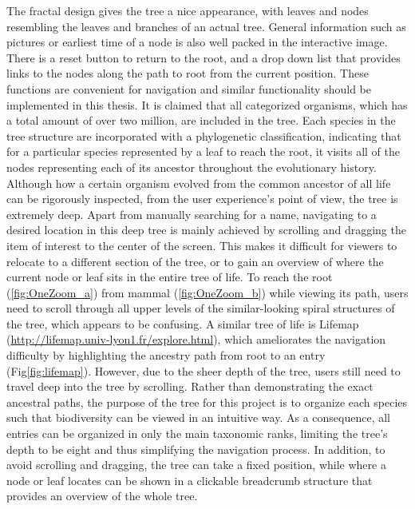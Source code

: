 \documentclass[11pt, a4paper,oneside,chapterprefix=false]{scrbook}
\begin{document}
The fractal design gives the tree a nice appearance, with leaves and nodes resembling the leaves and branches of an actual tree. General information such as pictures or earliest time of a node is also well packed in the interactive image. There is a reset button to return to the root, and a drop down list that provides links to the nodes along the path to root from the current position. These functions are convenient for navigation and similar functionality should be implemented in this thesis. It is claimed that all categorized organisms, which has a total amount of over two million, are included in the tree. Each species in the tree structure are incorporated with a phylogenetic classification, indicating that for a particular species represented by a leaf to reach the root, it visits all of the nodes representing each of its ancestor throughout the evolutionary history. Although how a certain organism evolved from the common ancestor of all life can be rigorously inspected, from the user experience's point of view, the tree is extremely deep. Apart from manually searching for a name, navigating to a desired location in this deep tree is mainly achieved by scrolling and dragging the item of interest to the center of the screen. This makes it difficult for viewers to relocate to a different section of the tree, or to gain an overview of where the current node or leaf sits in the entire tree of life. To reach the root (\ref{fig:OneZoom_a}) from mammal (\ref{fig:OneZoom_b}) while viewing its path, users need to scroll through all upper levels of the similar-looking spiral structures of the tree, which appears to be confusing. A similar tree of life is Lifemap (\url{http://lifemap.univ-lyon1.fr/explore.html}), which ameliorates the navigation difficulty by highlighting the ancestry path from root to an entry (Fig\ref{fig:lifemap}). However, due to the sheer depth of the tree, users still need to travel deep into the tree by scrolling. Rather than demonstrating the exact ancestral paths, the purpose of the tree for this project is to organize each species such that biodiversity can be viewed in an intuitive way. As a consequence, all entries can be organized in only the main taxonomic ranks, limiting the tree's depth to be eight and thus simplifying the navigation process. In addition, to avoid scrolling and dragging, the tree can take a fixed position, while where a node or leaf locates can be shown in a clickable breadcrumb structure that provides an overview of the whole tree. \\
\end{document}
